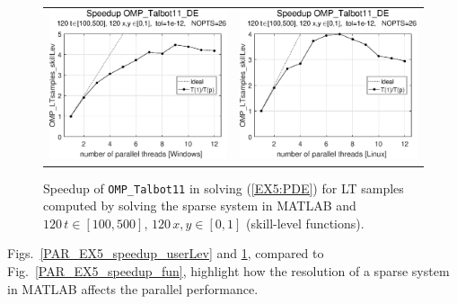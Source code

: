 \documentclass[a4paper,10pt]{report}%
\begin{document}
\begin{figure}[htb]
\centering
\begin{tabular}{cc} %
\includegraphics[height=0.2\textwidth]{./FIGS/EX5/EX5_skillLev_speedup_11_Windows.eps} &
\includegraphics[height=0.2\textwidth]{./FIGS/EX5/EX5_skillLev_speedup_11_Linux.eps}
\end{tabular}
\caption{\small Speedup of {\tt OMP\_Talbot11} in solving (\ref{EX5:PDE}) for LT samples computed by
solving the sparse system in MATLAB and $120\,t\in[100,500]$, $120\,x,y\in[0,1]$ (skill-level functions).}
\label{PAR_EX5_speedup_skillLev}
\end{figure}

\noindent Figs.~\ref{PAR_EX5_speedup_userLev} and \ref{PAR_EX5_speedup_skillLev}, compared to
Fig.~\ref{PAR_EX5_speedup_fun}, highlight how the resolution of a sparse system in MATLAB affects the
parallel performance.








\end{document}
